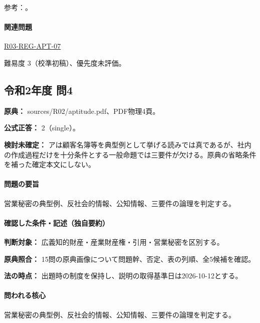 \par 参考：\cite{ip_unfair_statute,ip_secret_handbook2017,ip_secret_commentary2018}。

\paragraph{関連問題} \hyperref[q:r03-reg-apt-07]{R03-REG-APT-07}

\par 難易度 3（校準初稿）、優先度未評価。

\subsection{令和2年度 問4}
\label{q:r02-reg-apt-04}

\noindent\textbf{原典：} sources/R02/aptitude.pdf、PDF物理4頁。

\textbf{公式正答：} 2（single）。

\par\textbf{検討未確定：} アは顧客名簿等を典型例として挙げる読みでは真であるが、社内の作成過程だけを十分条件とする一般命題では三要件が欠ける。原典の省略条件を補った確定本文にしない。

\paragraph{問題の要旨} 営業秘密の典型例、反社会的情報、公知情報、三要件の論理を判定する。

\paragraph{確認した条件・記述（独自要約）}\mbox{}\par

\noindent\textbf{判断対象：} 広義知的財産・産業財産権・引用・営業秘密を区別する。\par

\noindent\textbf{原典照合：} 15問の原典画像について問題幹、否定、表の列順、全5候補を確認。\par

\noindent\textbf{法の時点：} 出題時の制度を保持し、説明の取得基準日は2026-10-12とする。\par

\paragraph{問われる核心} 営業秘密の典型例、反社会的情報、公知情報、三要件の論理を判定する。

